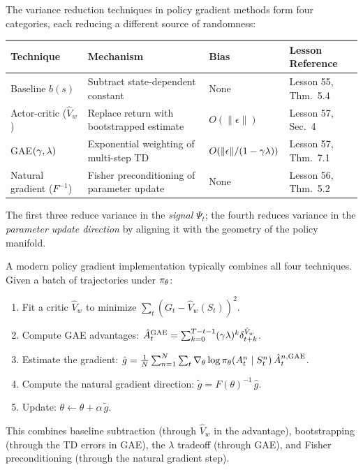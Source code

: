 \documentclass[11pt,a4paper]{article}
\begin{document}
\begin{keyresult}[title={Variance Reduction Taxonomy}]
\label{kr:var-taxonomy}
The variance reduction techniques in policy gradient methods form four
categories, each reducing a different source of randomness:
\begin{center}
\begin{tabular}{p{3.8cm}p{3.2cm}p{2.2cm}p{3.5cm}}
\toprule
\textbf{Technique} & \textbf{Mechanism} & \textbf{Bias} &
\textbf{Lesson Reference} \\
\midrule
Baseline $b(s)$ & Subtract state-dependent constant & None &
Lesson 55, Thm.\ 5.4 \\
Actor-critic ($\hat{V}_w$) & Replace return with bootstrapped estimate &
$O(\|\epsilon\|)$ & Lesson 57, Sec.\ 4 \\
GAE$(\gamma,\lambda)$ & Exponential weighting of multi-step TD &
$O(\|\epsilon\|/(1-\gamma\lambda))$ & Lesson 57, Thm.\ 7.1 \\
Natural gradient ($F^{-1}$) & Fisher preconditioning of parameter update &
None & Lesson 56, Thm.\ 5.2 \\
\bottomrule
\end{tabular}
\end{center}
The first three reduce variance in the \emph{signal} $\Psi_t$; the
fourth reduces variance in the \emph{parameter update direction}
by aligning it with the geometry of the policy manifold.
\end{keyresult}

\begin{example}
\label{ex:combined}
A modern policy gradient implementation typically combines all four
techniques. Given a batch of trajectories under $\pi_\theta$:
\begin{enumerate}
  \item Fit a critic $\hat{V}_w$ to minimize
    $\sum_t (G_t - \hat{V}_w(S_t))^2$.
  \item Compute GAE advantages:
    $\hat{A}_t^{\mathrm{GAE}} = \sum_{k=0}^{T-t-1}
    (\gamma\lambda)^k \delta_{t+k}^{\hat{V}_w}$.
  \item Estimate the gradient:
    $\hat{g} = \frac{1}{N} \sum_{n=1}^{N} \sum_t
    \nabla_\theta \log \pi_\theta(A_t^n \mid S_t^n)\,
    \hat{A}_t^{n,\mathrm{GAE}}$.
  \item Compute the natural gradient direction:
    $\tilde{g} = F(\theta)^{-1}\, \hat{g}$.
  \item Update: $\theta \leftarrow \theta + \alpha\, \tilde{g}$.
\end{enumerate}
This combines baseline subtraction (through $\hat{V}_w$ in the
advantage), bootstrapping (through the TD errors in GAE), the
$\lambda$ tradeoff (through GAE), and Fisher preconditioning
(through the natural gradient step).
\end{example}
\end{document}

